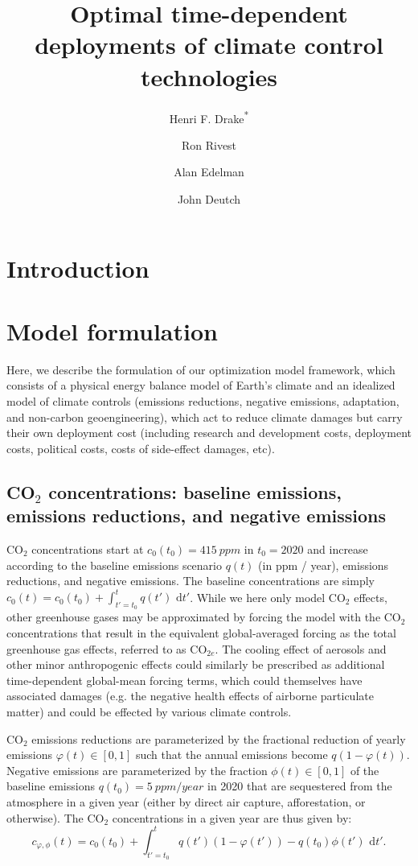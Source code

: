 \documentclass{article}
\title{Optimal time-dependent deployments of climate control technologies}
\author[1,2]{Henri F. Drake\textsuperscript{*}}
\author[1]{Ron Rivest}
\author[1]{Alan Edelman}
\author[1]{John Deutch}
\affil[1]{Massachusetts Institute of Technology, Cambridge, MA, USA}
\affil[2]{Woods Hole Oceanographic Institution, Woods Hole, MA, USA}
\date{}             %
\begin{document}
\maketitle

\section{Introduction}

\section{Model formulation}

Here, we describe the formulation of our optimization model framework, which consists of a physical energy balance model of Earth's climate and an idealized model of climate controls (emissions reductions, negative emissions, adaptation, and non-carbon geoengineering), which act to reduce climate damages but carry their own deployment cost (including research and development costs, deployment costs, political costs, costs of side-effect damages, etc).

\subsection{CO$_{2}$ concentrations: baseline emissions, emissions reductions, and negative emissions}

CO$_{2}$ concentrations start at $c_{0}(t_{0}) = \SI{415}{ppm}$ in $t_{0}=2020$ and increase according to the baseline emissions scenario $q(t)$ (in ppm / year), emissions reductions, and negative emissions. The baseline concentrations are simply $c_{0}(t) = c_{0}(t_{0}) + \int_{t'=t_{0}}^{t} q(t') \text{ d}t'$. While we here only model CO$_{2}$ effects, other greenhouse gases may be approximated by forcing the model with the CO$_{2}$ concentrations that result in the equivalent global-averaged forcing as the total greenhouse gas effects, referred to as CO$_{2e}$. The cooling effect of aerosols and other minor anthropogenic effects could similarly be prescribed as additional time-dependent global-mean forcing terms, which could themselves have associated damages (e.g. the negative health effects of airborne particulate matter) and could be effected by various climate controls.

CO$_{2}$ emissions reductions are parameterized by the fractional reduction of yearly emissions $\varphi(t) \in [0,1]$ such that the annual emissions become $q(1-\varphi(t))$. Negative emissions are parameterized by the fraction $\phi(t) \in [0,1]$ of the baseline emissions $q(t_{0}) = \SI{5}{ppm/year}$ in 2020 that are sequestered from the atmosphere in a given year (either by direct air capture, afforestation, or otherwise). The CO$_{2}$ concentrations in a given year are thus given by:
\begin{equation}
    c_{\varphi, \phi}(t) = c_{0}(t_{0}) + \int_{t'=t_{0}}^{t} q(t')(1-\varphi(t')) - q(t_{0}) \phi(t') \text{ d}t'.\label{eq-CO2-conc}
\end{equation}
\end{document}
